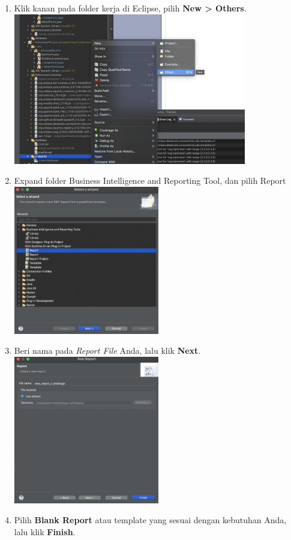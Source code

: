 \begin{enumerate}
	\item Klik kanan pada folder kerja di Eclipse, pilih \textbf{New > Others}. \\
	\includegraphics[width=0.8\textwidth]{assets/pertemuan14/New-Report/birt-new-other-file.png}
	
	\item Expand folder Business Intelligence and Reporting Tool, dan pilih Report \\
	\includegraphics[width=0.5\textwidth]{assets/pertemuan14/New-Report/birt-select-for-wizard-report.png}
	
	\item Beri nama pada \textit{Report File} Anda, lalu klik \textbf{Next}. \\
	\includegraphics[width=0.5\textwidth]{assets/pertemuan14/New-Report/birt-create-new-report.png}
	
	\item Pilih \textbf{Blank Report} atau template yang sesuai dengan kebutuhan Anda, lalu klik \textbf{Finish}.
\end{enumerate}


